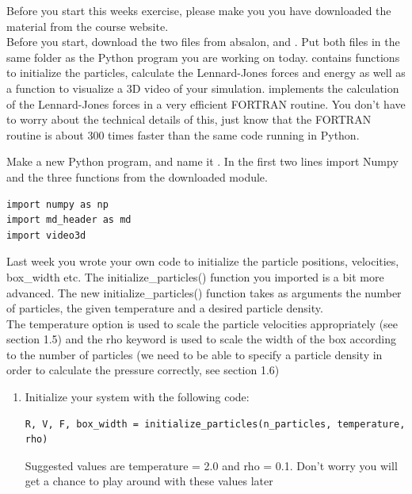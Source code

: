 \documentclass{article}
\begin{document}
Before you start this weeks exercise, please make you you have downloaded the
material from the course website.\\

Before you start, download the two files from absalon,  and
. Put both files in the same folder as the Python program you are
working on today.  contains functions to initialize the particles,
calculate the Lennard-Jones forces and energy as well as a function to
visualize a 3D video of your simulation.  implements the
calculation of the Lennard-Jones forces in a very efficient FORTRAN routine. You
don't have to worry about the technical details of this, just know that the
FORTRAN routine is about 300 times faster than the same code running in Python.

Make a new Python program, and name it .
In the first two lines import Numpy and the three functions from the downloaded
module.

\begin{lstlisting}
import numpy as np
import md_header as md
import video3d
\end{lstlisting}

Last week you wrote your own code to initialize the particle positions,
velocities, box\_width etc. The initialize\_particles() function you
imported is a bit more advanced.
The new initialize\_particles() function takes as arguments the number of
particles, the given temperature and a desired particle density.\\

The temperature option is used to scale the particle velocities appropriately
(see section 1.5) and the rho keyword is used to scale the width of the box
according to the number of particles (we need to be able to specify a particle
density in order to calculate the pressure correctly, see section 1.6)

\begin{enumerate}

    \item Initialize your system with the following code:

\begin{lstlisting}
R, V, F, box_width = initialize_particles(n_particles, temperature, rho)
\end{lstlisting}

        Suggested values are temperature = 2.0 and rho = 0.1.
        Don't worry you will get a chance to play around with these values later

\end{enumerate}
\end{document}
